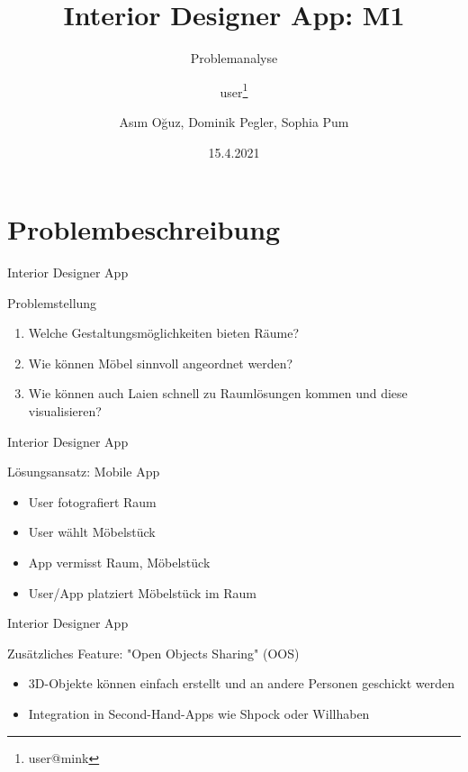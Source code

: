\documentclass[presentation,bigger,aspectratio=169]{beamer}
\author{user\thanks{user@mink}}
\date{15.4.2021}
\title{Interior Designer App: M1}
\subtitle{Problemanalyse}
\author[A.Oğuz, D.Pegler, S.Pum]{Asım Oğuz, Dominik Pegler, Sophia Pum}
\institute{Universität Wien, Fakultät für Informatik (SS2021)}
\begin{document}
\maketitle

\section{Problembeschreibung}
\label{sec:orgfafe7cc}

\begin{frame}[label={sec:org07c3253}]{\vspace{2.2cm}\begin{center}\MakeUppercase{\insertsection}\end{center}}
\end{frame}

\begin{frame}[label={sec:orgd4508e6}]{Interior Designer App}
\begin{block}{Problemstellung}
\begin{enumerate}
\item Welche Gestaltungsmöglichkeiten bieten Räume?
\item Wie können Möbel sinnvoll angeordnet werden?
\item Wie können auch Laien schnell zu Raumlösungen kommen und diese
visualisieren?
\end{enumerate}
\end{block}
\end{frame}
\begin{frame}[label={sec:org1b27bc0}]{Interior Designer App}
\begin{block}{Lösungsansatz: Mobile App}
\begin{itemize}
\item User fotografiert Raum
\item User wählt Möbelstück
\item App vermisst Raum, Möbelstück
\item User/App platziert Möbelstück im Raum
\end{itemize}
\vspace{0.8em}
\end{block}
\end{frame}

\begin{frame}[label={sec:org5273d86}]{Interior Designer App}
\begin{block}{Zusätzliches Feature: "Open Objects Sharing" (OOS)}
\begin{itemize}
\item 3D-Objekte können einfach erstellt und an andere Personen geschickt werden
\item Integration in Second-Hand-Apps wie Shpock oder Willhaben
\end{itemize}
\end{block}
\end{frame}
\end{document}
